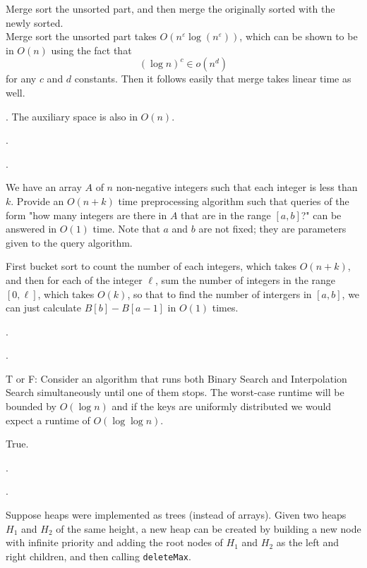 \documentclass{article}
\begin{document}
\begin{solution}
    Merge sort the unsorted part, and then merge the originally sorted with the newly sorted. \\ 
    Merge sort the unsorted part takes $O(n^\varepsilon \log (n^\varepsilon))$, which can be shown to be in $O(n)$ using the fact that 
    \[ (\log n)^c \in o(n^d) \]
    for any $c$ and $d$ constants. Then it follows easily that merge takes linear time as well. 
    \begin{comm}[].
        The auxiliary space is also in $O(n)$. 
    \end{comm}
\end{solution}

\begin{exer}[]. \begin{cate}. \end{cate}
    We have an array $A$ of $n$ non-negative integers such that each integer is less than $k$. Provide an $O(n + k)$ time preprocessing algorithm such that queries of the form "how many integers are there in $A$ that are in the range $[a, b]$?" can be answered in $O(1)$ time. Note that $a$ and $b$ are not fixed; they are parameters given to the query algorithm.
\end{exer} 

\begin{solution}
    First bucket sort to count the number of each integers, which takes $O(n+k)$, and then for each of the integer $\ell$, sum the number of integers in the range $[0, \ell]$, which takes $O(k)$, so that to find the number of intergers in $[a, b]$, we can just calculate $B[b] - B[a-1]$ in $O(1)$ times. 
\end{solution}

\begin{exer}[]. \begin{cate}. \end{cate}
    T or F: Consider an algorithm that runs both Binary Search and Interpolation Search simultaneously until one of them stops. The worst-case runtime will be bounded by $O(\log n)$ and if the keys are uniformly distributed we would expect a runtime of $O(\log \log n)$.
\end{exer}

\begin{solution}
    True. 
\end{solution}

\begin{exer}[]. \begin{cate}[Heap]. \end{cate}
    Suppose heaps were implemented as trees (instead of arrays). Given two heaps $H_1$ and $H_2$ of the same height, a new heap can be created by building a new node with infinite priority and adding the root nodes of $H_1$ and $H_2$ as the left and right children, and then calling \texttt{deleteMax}.
\end{exer}
\end{document}
